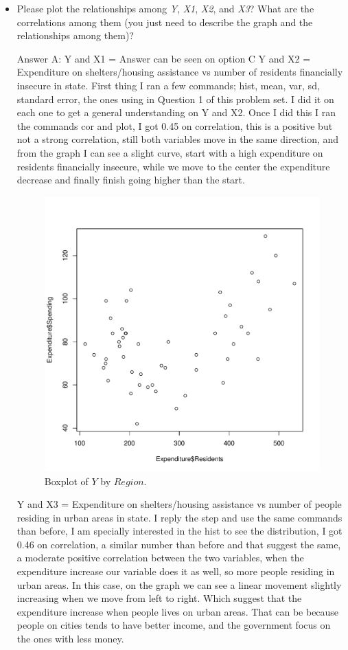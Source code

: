 \documentclass[12pt,letterpaper]{article}
\begin{document}
\begin{itemize}
\item
Please plot the relationships among \emph{Y}, \emph{X1}, \emph{X2}, and \emph{X3}? What are the correlations among them (you just need to describe the graph and the relationships among them)?
\vspace{.5cm}


	Answer A:
	Y and X1 = Answer can be seen on option C
	Y and X2 = Expenditure on shelters/housing assistance vs number of residents financially insecure in state.
	First thing I ran a few commands; hist, mean, var, sd, standard error, the ones using in Question 1 of this problem set. I did it on each one to get a general understanding on Y and X2. Once I did this I ran the commands cor and plot, I got 0.45 on correlation, this is a positive but not a strong correlation, still both variables move in the same direction, and from the graph I can see a slight curve, start with a high expenditure on residents financially insecure, while we move to the center the expenditure decrease and finally finish going higher than the start. 
	
	\begin{figure}[h!]\centering
		\caption{\footnotesize Boxplot of $Y$ by $Region$.}\vspace{-1cm}
		\label{fig:plot_3c}
		\includegraphics[width=.75\textwidth]{IMAGEP2_A.pdf}
	\end{figure}
	
	Y and X3 = Expenditure on shelters/housing assistance vs number of people residing in urban areas in state.
	I reply the step and use the same commands than before, I am specially interested in the hist to see the distribution, I got 0.46 on correlation, a similar number than before and that suggest the same, a moderate positive correlation between the two variables, when the expenditure increase our variable does it as well, so more people residing in urban areas. In this case, on the graph we can see a linear movement slightly increasing when we move from left to right. Which suggest that the expenditure increase when people lives on urban areas. That can be because people on cities tends to have better income, and the government focus on the ones with less money.
	

\end{itemize}
\end{document}
